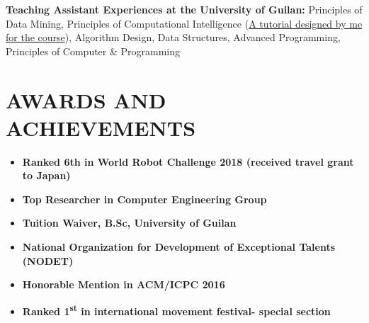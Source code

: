 \documentclass[11pt,a4paper,roman,colorlinks,linkcolor=blue,filecolor=magenta,urlcolor=cyan]{moderncv}        %
\begin{document}
\vspace{2mm}

\textbf{Teaching Assistant Experiences at the University of Guilan:}
Principles of Data Mining, Principles of Computational Intelligence (\href{https://github.com/Computational-Intelligence-Fall18/Computational-Intelligence-Tutorials}{A tutorial designed by me for the course}), Algorithm Design, Data Structures, Advanced Programming, Principles of Computer \& Programming


\section{AWARDS AND ACHIEVEMENTS}
\begin{minipage}{\maincolumnwidth}%
	\small{
    	\begin{itemize}
    			\item \textbf{Ranked 6th in World Robot Challenge 2018 (received travel grant to Japan)}%
    			\item \textbf{Top Researcher in Computer Engineering Group}%
    			\item \textbf{Tuition Waiver, B.Sc, University of Guilan} %
                \item \textbf{National Organization for Development of Exceptional Talents (NODET)} %
                \item \textbf{Honorable Mention in ACM/ICPC 2016}%
               \item \textbf{Ranked 1\textsuperscript{st} in international movement festival- special section}%
		\end{itemize}}%
\end{minipage}%
\end{document}
